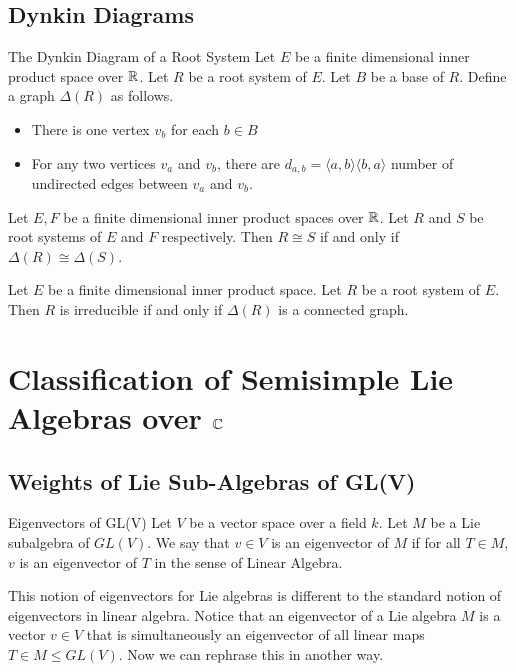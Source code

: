 \documentclass[a4paper]{article}
\begin{document}
\subsection{Dynkin Diagrams}
\begin{defn}{The Dynkin Diagram of a Root System}{} Let $E$ be a finite dimensional inner product space over $\mathbb{R}$. Let $R$ be a root system of $E$. Let $B$ be a base of $R$. Define a graph $\Delta(R)$ as follows. 
\begin{itemize}
\item There is one vertex $v_b$ for each $b\in B$
\item For any two vertices $v_a$ and $v_b$, there are $d_{a,b}=\langle a,b\rangle\langle b,a\rangle$ number of undirected edges between $v_a$ and $v_b$. 
\end{itemize}
\end{defn}

\begin{prp}{}{} Let $E,F$ be a finite dimensional inner product spaces over $\mathbb{R}$. Let $R$ and $S$ be root systems of $E$ and $F$ respectively. Then $R\cong S$ if and only if $\Delta(R)\cong\Delta(S)$. 
\end{prp}

\begin{prp}{}{} Let $E$ be a finite dimensional inner product space. Let $R$ be a root system of $E$. Then $R$ is irreducible if and only if $\Delta(R)$ is a connected graph. 
\end{prp}

\pagebreak
\section{Classification of Semisimple Lie Algebras over $\mathbb{C}$}
\subsection{Weights of Lie Sub-Algebras of GL(V)}
\begin{defn}{Eigenvectors of GL(V)}{} Let $V$ be a vector space over a field $k$. Let $M$ be a Lie subalgebra of $GL(V)$. We say that $v\in V$ is an eigenvector of $M$ if for all $T\in M$, $v$ is an eigenvector of $T$ in the sense of Linear Algebra. 
\end{defn}

This notion of eigenvectors for Lie algebras is different to the standard notion of eigenvectors in linear algebra. Notice that an eigenvector of a Lie algebra $M$ is a vector $v\in V$ that is simultaneously an eigenvector of all linear maps $T\in M\leq GL(V)$. Now we can rephrase this in another way. 
\end{document}
